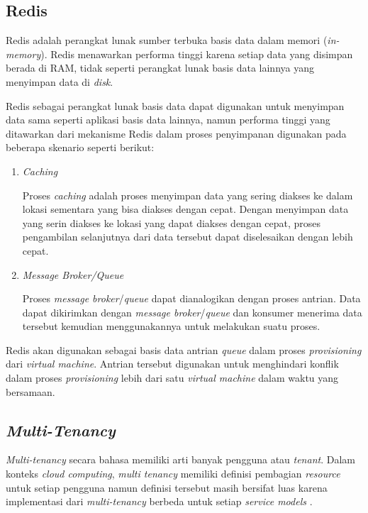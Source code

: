 \subsection{Redis}
\label{sec:redis}

Redis adalah perangkat lunak sumber terbuka basis data dalam memori (\emph{in-memory}).
Redis menawarkan performa tinggi karena setiap data yang disimpan berada di RAM, tidak seperti
perangkat lunak basis data lainnya yang menyimpan data di \emph{disk}.

Redis sebagai perangkat lunak basis data dapat digunakan untuk menyimpan data sama seperti
aplikasi basis data lainnya, namun performa tinggi yang ditawarkan 
dari mekanisme Redis dalam proses penyimpanan digunakan pada beberapa skenario
seperti berikut:

\begin{enumerate}

  \item \emph{Caching}
    
    Proses \emph{caching} adalah proses menyimpan data yang sering diakses ke dalam
    lokasi sementara yang bisa diakses dengan cepat. Dengan menyimpan data yang serin
    diakses ke lokasi yang dapat diakses dengan cepat, proses pengambilan selanjutnya
    dari data tersebut dapat diselesaikan dengan lebih cepat.

  \item \emph{Message Broker/Queue}

    Proses \emph{message broker}/\emph{queue} dapat dianalogikan dengan proses antrian.
    Data dapat dikirimkan dengan \emph{message broker}/\emph{queue} dan konsumer menerima
    data tersebut kemudian menggunakannya untuk melakukan suatu proses.

\end{enumerate}

Redis akan digunakan sebagai basis data antrian \emph{queue} dalam proses \emph{provisioning} dari
\emph{virtual machine}. Antrian tersebut digunakan untuk menghindari konflik dalam proses \emph{provisioning}
lebih dari satu \emph{virtual machine} dalam waktu yang bersamaan.

\subsection{\emph{Multi-Tenancy}}
\label{sec:multi-tenancy}

\emph{Multi-tenancy} secara bahasa memiliki arti banyak pengguna atau \emph{tenant}. Dalam konteks
\emph{cloud computing}, \emph{multi tenancy} memiliki definisi pembagian \emph{resource} 
untuk setiap pengguna namun definisi tersebut masih bersifat luas karena implementasi
dari \emph{multi-tenancy} berbeda untuk setiap \emph{service models} \parencite{6830928}.


